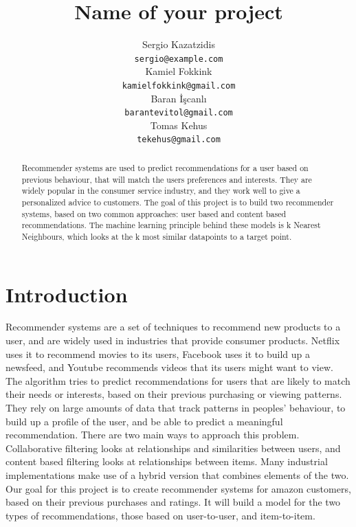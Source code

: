 \documentclass[11pt]{article}
\title{Name of your project}
\author{Sergio Kazatzidis \\
    {\tt sergio@example.com} \\
    Kamiel Fokkink \\
    {\tt kamielfokkink@gmail.com} \\\And
    Baran İşcanlı \\
    {\tt barantevitol@gmail.com} \\
    Tomas Kehus \\
    {\tt tekehus@gmail.com}}
\date{}
\begin{document}
\maketitle
\begin{abstract}
    Recommender systems are used to predict recommendations for a user based on previous behaviour, that will match the users preferences and interests. They are widely popular in the consumer service industry, and they work well to give a personalized advice to customers. The goal of this project is to build two recommender systems, based on two common approaches: user based and content based recommendations. The machine learning principle behind these models is k Nearest Neighbours, which looks at the k most similar datapoints to a target point.
\end{abstract}

\noindent

\section{Introduction}
Recommender systems are a set of techniques to recommend new products to a user, and are widely used in industries that provide consumer products. Netflix uses it to recommend movies to its users, Facebook uses it to build up a newsfeed, and Youtube recommends videos that its users might want to view. The algorithm tries to predict recommendations for users that are likely to match their needs or interests, based on their previous purchasing or viewing patterns. They rely on large amounts of data that track patterns in peoples' behaviour, to build up a profile of the user, and be able to predict a meaningful recommendation. There are two main ways to approach this problem. Collaborative filtering looks at relationships and similarities between users, and content based filtering looks at relationships between items. Many industrial implementations make use of a hybrid version that combines elements of the two. Our goal for this project is to create recommender systems for amazon customers, based on their previous purchases and ratings. It will build a model for the two types of recommendations, those based on user-to-user, and item-to-item. \\
\end{document}

